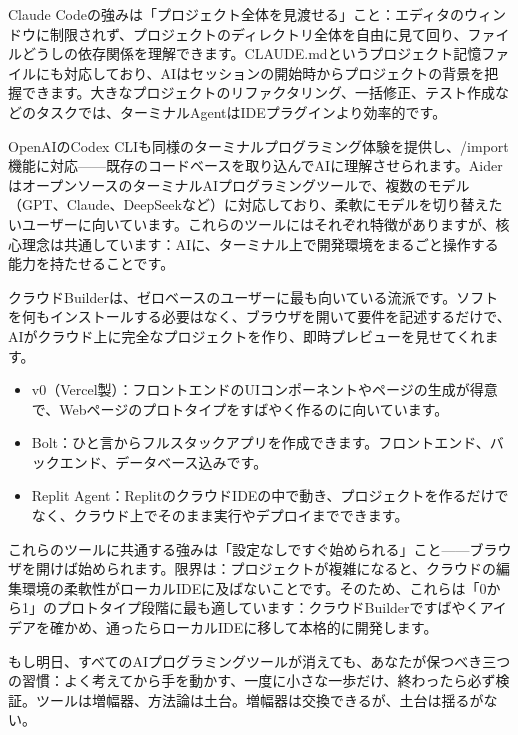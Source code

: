 Claude Codeの強みは「プロジェクト全体を見渡せる」こと：エディタのウィンドウに制限されず、プロジェクトのディレクトリ全体を自由に見て回り、ファイルどうしの依存関係を理解できます。CLAUDE.mdというプロジェクト記憶ファイルにも対応しており、AIはセッションの開始時からプロジェクトの背景を把握できます。大きなプロジェクトのリファクタリング、一括修正、テスト作成などのタスクでは、ターミナルAgentはIDEプラグインより効率的です。


OpenAIのCodex CLIも同様のターミナルプログラミング体験を提供し、/import機能に対応——既存のコードベースを取り込んでAIに理解させられます。AiderはオープンソースのターミナルAIプログラミングツールで、複数のモデル（GPT、Claude、DeepSeekなど）に対応しており、柔軟にモデルを切り替えたいユーザーに向いています。これらのツールにはそれぞれ特徴がありますが、核心理念は共通しています：AIに、ターミナル上で開発環境をまるごと操作する能力を持たせることです。


クラウドBuilderは、ゼロベースのユーザーに最も向いている流派です。ソフトを何もインストールする必要はなく、ブラウザを開いて要件を記述するだけで、AIがクラウド上に完全なプロジェクトを作り、即時プレビューを見せてくれます。

\begin{itemize}
  \item v0（Vercel製）：フロントエンドのUIコンポーネントやページの生成が得意で、Webページのプロトタイプをすばやく作るのに向いています。
  \item Bolt：ひと言からフルスタックアプリを作成できます。フロントエンド、バックエンド、データベース込みです。
  \item Replit Agent：ReplitのクラウドIDEの中で動き、プロジェクトを作るだけでなく、クラウド上でそのまま実行やデプロイまでできます。
\end{itemize}

これらのツールに共通する強みは「設定なしですぐ始められる」こと——ブラウザを開けば始められます。限界は：プロジェクトが複雑になると、クラウドの編集環境の柔軟性がローカルIDEに及ばないことです。そのため、これらは「0から1」のプロトタイプ段階に最も適しています：クラウドBuilderですばやくアイデアを確かめ、通ったらローカルIDEに移して本格的に開発します。


もし明日、すべてのAIプログラミングツールが消えても、あなたが保つべき三つの習慣：よく考えてから手を動かす、一度に小さな一歩だけ、終わったら必ず検証。ツールは増幅器、方法論は土台。増幅器は交換できるが、土台は揺るがない。

